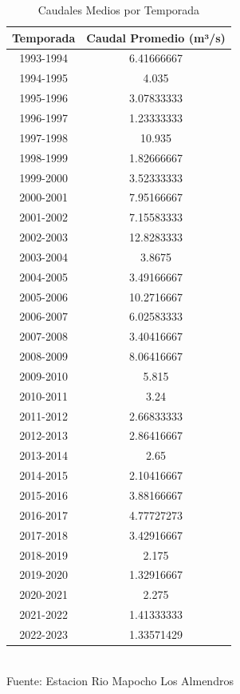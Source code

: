 \documentclass{article} %
\begin{document}
\begin{table}[H]
    \centering
    \small %
    \caption{Caudales Medios por Temporada}
    \vspace{0.2cm}
    \begin{tabular}{|c|c|}
        \hline
        \textbf{Temporada} & \textbf{Caudal Promedio (m³/s)} \\
        \hline
        1993-1994 & 6.41666667 \\
        1994-1995 & 4.035 \\
        1995-1996 & 3.07833333 \\
        1996-1997 & 1.23333333 \\
        1997-1998 & 10.935 \\
        1998-1999 & 1.82666667 \\
        1999-2000 & 3.52333333 \\
        2000-2001 & 7.95166667 \\
        2001-2002 & 7.15583333 \\
        2002-2003 & 12.8283333 \\
        2003-2004 & 3.8675 \\
        2004-2005 & 3.49166667 \\
        2005-2006 & 10.2716667 \\
        2006-2007 & 6.02583333 \\
        2007-2008 & 3.40416667 \\
        2008-2009 & 8.06416667 \\
        2009-2010 & 5.815 \\
        2010-2011 & 3.24 \\
        2011-2012 & 2.66833333 \\
        2012-2013 & 2.86416667 \\
        2013-2014 & 2.65 \\
        2014-2015 & 2.10416667 \\
        2015-2016 & 3.88166667 \\
        2016-2017 & 4.77727273 \\
        2017-2018 & 3.42916667 \\
        2018-2019 & 2.175 \\
        2019-2020 & 1.32916667 \\
        2020-2021 & 2.275 \\
        2021-2022 & 1.41333333 \\
        2022-2023 & 1.33571429 \\
        \hline
    \end{tabular}
    \label{tab:caudales_temporada}
    \vspace{0.2cm}
    \\Fuente: Estacion Rio Mapocho Los Almendros
\end{table}
\end{document}
